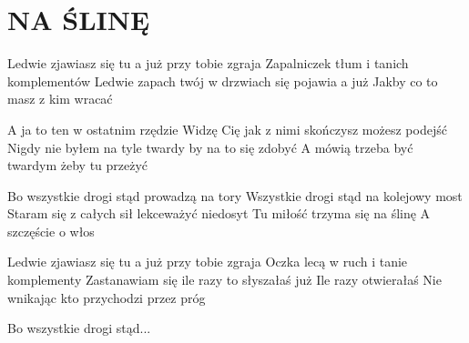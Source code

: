 \documentclass[../../../songbook.tex]{subfiles}
\begin{document}
\TabPositions{8cm} %
\section*{NA ŚLINĘ}
{}
\vspace{0.5cm}
Ledwie zjawiasz się tu a już przy tobie zgraja	 \newline
Zapalniczek tłum i tanich komplementów		 	 \newline
Ledwie zapach twój w drzwiach się pojawia a już	 \newline
Jakby co to masz z kim wracać					 \newline

A ja to ten w ostatnim rzędzie \newline
Widzę Cię jak z nimi skończysz możesz podejść \newline
Nigdy nie byłem na tyle twardy by na to się zdobyć \newline
A mówią trzeba być twardym żeby tu przeżyć \newline

\-\hspace{1cm} Bo wszystkie drogi stąd prowadzą na tory \newline
\-\hspace{1cm} Wszystkie drogi stąd na kolejowy most \newline
\-\hspace{1cm} Staram się z całych sił lekceważyć niedosyt \newline
\-\hspace{1cm} Tu miłość trzyma się na ślinę \newline
\-\hspace{1cm} A szczęście o włos \newline

Ledwie zjawiasz się tu a już przy tobie zgraja \newline
Oczka lecą w ruch i tanie komplementy \newline
Zastanawiam się ile razy to słyszałaś już \newline
Ile razy otwierałaś \newline
Nie wnikając kto przychodzi przez próg \newline

\-\hspace{1cm} Bo wszystkie drogi stąd... \newline
\end{document}
